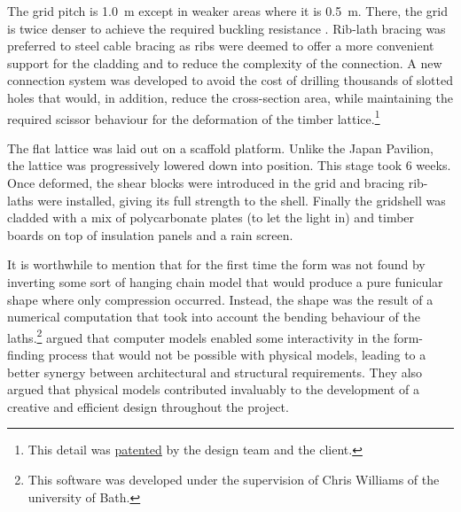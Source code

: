 
The grid pitch is \SI{1.0}{m} except in weaker areas where it is \SI{0.5}{m}. There, the grid is twice denser to achieve the required buckling resistance \cite{Harris2003}. Rib-lath bracing was preferred to steel cable bracing as ribs were deemed to offer a more convenient support for the cladding and to reduce the complexity of the connection. A new connection system was developed to avoid the cost of drilling thousands of slotted holes that would, in addition, reduce the cross-section area, while maintaining the required scissor behaviour for the deformation of the timber lattice.\footnote{This detail was \href{https://patents.google.com/patent/GB2361504A/en?q=\%22A+coupling+and+a+method+of+constructing+grid+shell+buildings+using+such+a+coupling\%22&country=GB}{patented} by the design team and the client.}

The flat lattice was laid out on a scaffold platform. Unlike the Japan Pavilion, the lattice was progressively lowered down into position. This stage took 6 weeks. Once deformed, the shear blocks were introduced in the grid and bracing rib-laths were installed, giving its full strength to the shell. Finally the gridshell was cladded with a mix of polycarbonate plates (to let the light in) and timber boards on top of insulation panels and a rain screen.

It is worthwhile to mention that for the first time the form was not found by inverting some sort of hanging chain model that would produce a pure funicular shape where only compression occurred. Instead, the shape was the result of a numerical computation that took into account the bending behaviour of the laths.\footnote{This software was developed under the supervision of Chris Williams of the university of Bath.} \citet{Harris2003} argued that computer models enabled some interactivity in the form-finding process that would not be possible with physical models, leading to a better synergy between architectural and structural requirements. They also argued that physical models contributed invaluably to the development of a creative and efficient design throughout the project.


